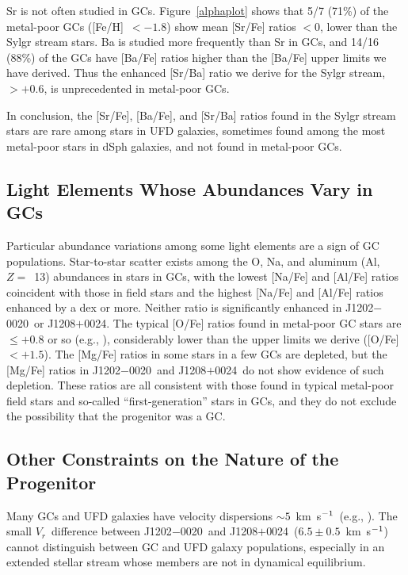 \documentclass[twocolumn,tighten]{aastex62}
\newcommand{\jtwo}{J1202$-$0020}
\newcommand{\jeight}{J1208$+$0024}
\newcommand{\kmsec}{\mbox{km~s$^{\rm -1}$}}
\newcommand{\rv}{$V_{r}$}
\begin{document}
Sr is not often studied in GCs.
Figure~\ref{alphaplot} shows that 5/7 (71\%) of the
metal-poor GCs ([Fe/H]~$< -1.8$) 
show mean [Sr/Fe] ratios $< 0$, 
lower than the Sylgr stream stars.
Ba is studied more frequently than Sr in GCs,
and 14/16 (88\%) of the GCs
have [Ba/Fe] ratios
higher than the [Ba/Fe] upper limits
we have derived.
Thus the enhanced [Sr/Ba] ratio
we derive for the Sylgr stream, $> +0.6$,
is unprecedented in metal-poor GCs.

In conclusion,
the [Sr/Fe], [Ba/Fe], and [Sr/Ba] ratios 
found in the Sylgr stream stars are rare 
among stars in UFD galaxies, sometimes found
among the most metal-poor stars
in dSph galaxies, and not found in metal-poor GCs.~


\subsection{Light Elements Whose Abundances Vary in GCs}
\label{cluesnaal}


Particular abundance variations among some light elements
are a sign of GC populations.
Star-to-star scatter exists
among the O, Na, and aluminum (Al, $Z =$~13) abundances in stars
in GCs, with the lowest [Na/Fe] and [Al/Fe] ratios
coincident with those in field stars and the
highest [Na/Fe] and [Al/Fe] ratios enhanced by a dex or more.
Neither ratio is significantly enhanced in \jtwo\ or \jeight.
The typical [O/Fe] ratios found in metal-poor GC stars 
are $\leq +0.8$ or so 
(e.g., \citealt{carretta09ona}),
considerably lower than the upper limits we derive 
([O/Fe]~$< +1.5$).
The [Mg/Fe] ratios in some stars in a few GCs
are depleted,
but the [Mg/Fe] ratios in \jtwo\ and \jeight\
do not show evidence of such depletion.
These ratios are all consistent with those
found in typical metal-poor field stars
and so-called ``first-generation'' stars in GCs, 
and they do not exclude the possibility 
that the progenitor was a GC.


\subsection{Other Constraints on the Nature of the Progenitor}
\label{sec:density}


Many GCs and UFD galaxies have 
velocity dispersions $\sim 5$~\kmsec\ 
(e.g., \citealt{harris96,simon07}).
The small \rv\ difference between
\jtwo\ and \jeight\ ($6.5\pm0.5$~\kmsec)
cannot distinguish between GC and UFD galaxy populations,
especially in an extended stellar stream whose members
are not in dynamical equilibrium.
\end{document}
